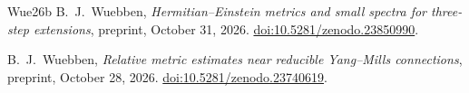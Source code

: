 \documentclass[11pt]{amsart}
\theoremstyle{definition}
\theoremstyle{remark}
\begin{document}
\begin{thebibliography}{Wue26b}
B.~J.~Wuebben, \emph{Hermitian--Einstein metrics and small spectra for
three-step extensions}, preprint, October 31, 2026.
\href{https://doi.org/10.5281/zenodo.23850990}{doi:10.5281/zenodo.23850990}.

B.~J.~Wuebben, \emph{Relative metric estimates near reducible Yang--Mills connections},
preprint, October 28, 2026.
\href{https://doi.org/10.5281/zenodo.23740619}{doi:10.5281/zenodo.23740619}.

\end{thebibliography}
\end{document}
